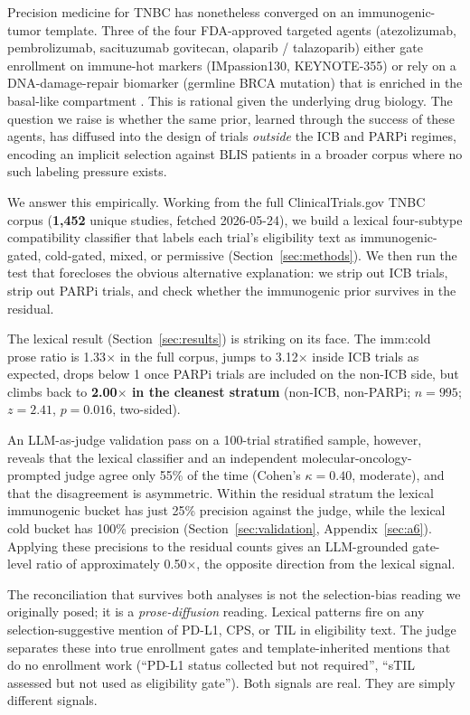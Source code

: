 \documentclass{article}
\begin{document}
Precision medicine for TNBC has nonetheless converged on an
immunogenic-tumor template.  Three of the four FDA-approved targeted
agents (atezolizumab, pembrolizumab, sacituzumab govitecan, olaparib /
talazoparib) either gate enrollment on immune-hot markers
(IMpassion130, KEYNOTE-355) or rely on a DNA-damage-repair biomarker
(germline BRCA mutation) that is enriched in the basal-like compartment
\cite{schmid2018,cortes2020,robson2017,subhan2023}.  This is rational
given the underlying drug biology.  The question we raise is whether
the same prior, learned through the success of these agents, has
diffused into the design of trials \emph{outside} the ICB and PARPi
regimes, encoding an implicit selection against BLIS patients in a
broader corpus where no such labeling pressure exists.

We answer this empirically.  Working from the full ClinicalTrials.gov
TNBC corpus (\textbf{1{,}452} unique studies, fetched 2026-05-24), we
build a lexical four-subtype compatibility classifier that labels each
trial's eligibility text as immunogenic-gated, cold-gated, mixed, or
permissive (Section~\ref{sec:methods}).  We then run the test that
forecloses the obvious alternative explanation: we strip out ICB
trials, strip out PARPi trials, and check whether the immunogenic
prior survives in the residual.

The lexical result (Section~\ref{sec:results}) is striking on its face.
The imm:cold prose ratio is 1.33$\times$ in the full corpus, jumps to
3.12$\times$ inside ICB trials as expected, drops below 1 once PARPi
trials are included on the non-ICB side, but climbs back to
\textbf{2.00$\times$ in the cleanest stratum} (non-ICB, non-PARPi;
$n=995$; $z=2.41$, $p=0.016$, two-sided).

An LLM-as-judge validation pass on a 100-trial stratified sample,
however, reveals that the lexical classifier and an independent
molecular-oncology-prompted judge agree only 55\% of the time
(Cohen's $\kappa=0.40$, moderate), and that the disagreement is
asymmetric.  Within the residual stratum the lexical immunogenic
bucket has just 25\% precision against the judge, while the lexical
cold bucket has 100\% precision (Section~\ref{sec:validation},
Appendix~\ref{sec:a6}).  Applying these precisions to the residual
counts gives an LLM-grounded gate-level ratio of approximately
0.50$\times$, the opposite direction from the lexical signal.

The reconciliation that survives both analyses is not the
selection-bias reading we originally posed; it is a
\emph{prose-diffusion} reading.  Lexical patterns fire on any
selection-suggestive mention of PD-L1, CPS, or TIL in eligibility
text.  The judge separates these into true enrollment gates and
template-inherited mentions that do no enrollment work (``PD-L1
status collected but not required'', ``sTIL assessed but not used as
eligibility gate'').  Both signals are real.  They are simply
different signals.
\end{document}
